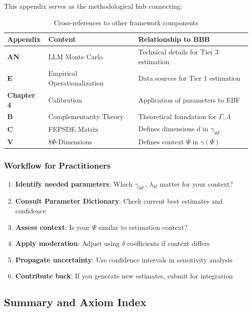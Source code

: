 This appendix serves as the methodological hub connecting:

\begin{table}[h]
\centering
\small
\begin{tabular}{lll}
\toprule
\textbf{Appendix} & \textbf{Content} & \textbf{Relationship to BBB} \\
\midrule
\textbf{AN} & LLM Monte Carlo & Technical details for Tier 3 estimation \\
\textbf{E} & Empirical Operationalization & Data sources for Tier 1 estimation \\
\textbf{Chapter 4} & Calibration & Application of parameters to EBF \\
\textbf{B} & Complementarity Theory & Theoretical foundation for $\Gamma, \Lambda$ \\
\textbf{C} & FEPSDE Matrix & Defines dimensions $d$ in $\gamma_{dd'}$ \\
\textbf{V} & 8$\Psi$-Dimensions & Defines context $\Psi$ in $\gamma(\Psi)$ \\
\bottomrule
\end{tabular}
\caption{Cross-references to other framework components}
\label{tab:bbb-crossref}
\end{table}

\subsubsection{Workflow for Practitioners}

\begin{enumerate}
    \item \textbf{Identify needed parameters}: Which $\gamma_{dd'}$, $\lambda_{kl}$ matter for your context?
    \item \textbf{Consult Parameter Dictionary}: Check current best estimates and confidence
    \item \textbf{Assess context}: Is your $\Psi$ similar to estimation context?
    \item \textbf{Apply moderation}: Adjust using $\delta$ coefficients if context differs
    \item \textbf{Propagate uncertainty}: Use confidence intervals in sensitivity analysis
    \item \textbf{Contribute back}: If you generate new estimates, submit for integration
\end{enumerate}

\subsection{Summary and Axiom Index}
\label{sec:BBB-summary}


